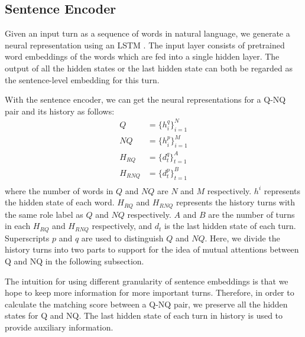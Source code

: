 \subsection{Sentence Encoder}
\label{sec:sentence-encoder}

Given an input turn as a sequence of words in natural language, we generate a neural representation using an LSTM \cite{gers1999learning}. The input layer consists of pretrained word embeddings of the words which are fed into a single hidden layer. The output of all the hidden states or the last hidden state can both be regarded as the sentence-level embedding for this turn.

With the sentence encoder, we can get the neural representations for a Q-NQ pair and its history as follows:
\begin{equation}
\begin{aligned}
Q&=\{h_i^q\}_{i=1}^{N}\\
NQ&= \{h_i^p\}_{i=1}^{M}\\
H_{RQ}&=\{d_t^q\}_{t=1}^{A}\\
H_{RNQ}&=\{d_t^p\}_{t=1}^{B}\\
\end{aligned}
\end{equation}
where the number of words in $Q$ and $NQ$ are $N$ and $M$ respectively. $h^i$ represents the hidden state of each word. $H_{RQ}$ and $H_{RNQ}$ represents the history turns with the same role label as $Q$ and $NQ$ respectively. $A$ and $B$ are the number of turns in each $H_{RQ}$ and $H_{RNQ}$ respectively, and $d_t$ is the last hidden state of each turn. Superscripts $p$ and $q$ are used to distinguish $Q$ and $NQ$. Here, we divide the history turns into 
two parts to support for the idea of mutual attentions between Q and NQ
in the following subsection.

The intuition for using different granularity of sentence embeddings is that we hope to 
keep more information for more important turns. Therefore, in order to calculate 
the matching score between a Q-NQ pair, we preserve all the hidden states for Q and NQ. 
The last hidden state of each turn in history is used to provide auxiliary information.


